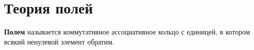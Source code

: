 \section{Теория полей}
\textbf{Полем} называется коммутативное ассоциативное кольцо с единицей, в котором всякий ненулевой элемент обратим.